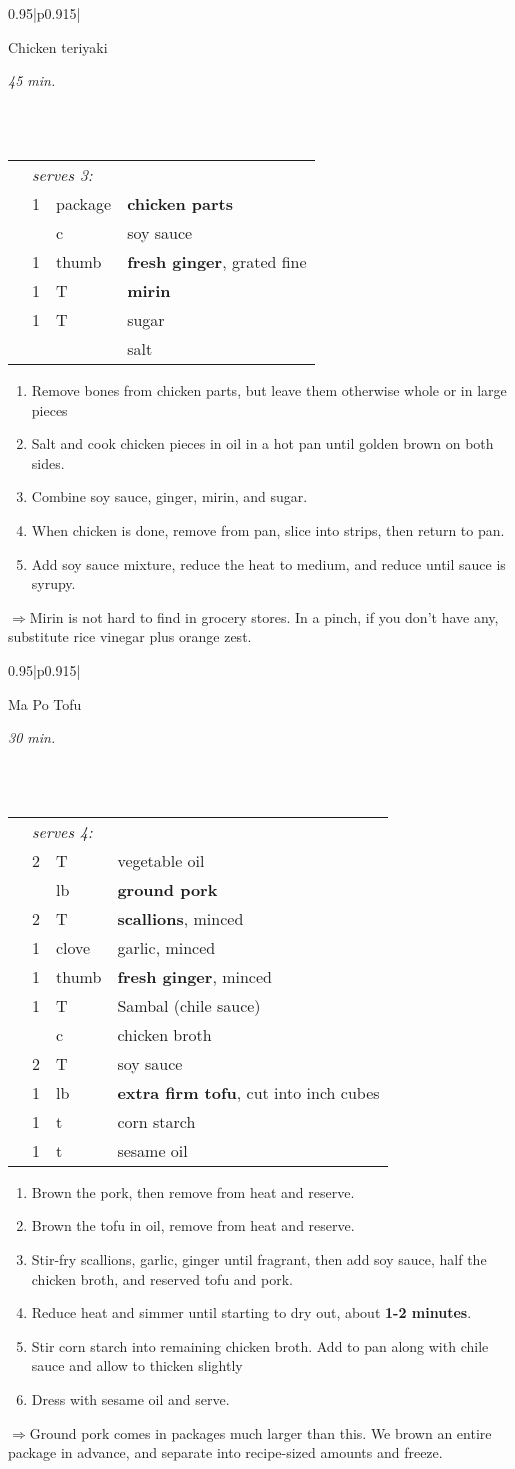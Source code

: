 \documentclass[8pt]{report}
\newcommand{\ingredmargin}{0.25cm}
\newcommand{\fr}[2]{\nicefrac{#1}{#2}}
\newenvironment{recipe}[3]
  {\bigskip \bigskip 
\begin{tabular*}{0.95\textwidth}{|p{0.915\textwidth}|} \hline \vspace{0.25mm}
\begin{minipage}{0.7\textwidth}	\begin{flushleft} {\Large \textsf{#1}} \end{flushleft} \end{minipage}
\begin{minipage}{0.2\textwidth} \begin{flushright} \emph{#2} \end{flushright} \end{minipage} \\ \\ \hline
\begin{ingreds}{#3} \addcontentsline{toc}{section}{#1} \phantomsection \label{rec:#1}} 
  {\\ \hline \end{tabular*} \noindent}
\newenvironment{ingreds}[1]
  {\begin{tabular}{lrlp{0.6\textwidth}} \hspace{\ingredmargin} & \multicolumn{3}{l}{\it #1:} \\}
  {\end{tabular} \medskip}
\newcommand{\ingredsdone}{\end{ingreds}\begin{enumerate}}
\newcommand{\stepsdone}{\end{enumerate} \medskip}
\newcommand{\ingredient}[3]{\hspace{\ingredmargin} & #1 & #2 & #3 \\}
\newcommand{\tip}{$\Rightarrow$}
\begin{document}
\begin{recipe}{Chicken teriyaki}{45 min.}{serves 3}
\index{chicken!teriyaki} \index{japanese!chicken teriyaki}
\ingredient{1}{package}{{\bf chicken parts}}
\ingredient{\fr14}{c}{soy sauce}
\ingredient{1}{thumb}{{\bf fresh ginger}, grated fine}
\ingredient{1}{T}{{\bf mirin}}
\ingredient{1}{T}{sugar}
\ingredient{}{}{salt}
\ingredsdone
\item Remove bones from chicken parts, but leave them otherwise whole or in large pieces
\item Salt and cook chicken pieces in oil in a hot pan until golden brown on both sides.
\item Combine soy sauce, ginger, mirin, and sugar.
\item When chicken is done, remove from pan, slice into strips, then return to pan.
\item Add soy sauce mixture, reduce the heat to medium, and reduce until sauce is syrupy.
\stepsdone
\noindent \tip Mirin is not hard to find in grocery stores.  In a pinch, if you don't have any, substitute rice vinegar plus orange zest.
\end{recipe}

\begin{recipe}{Ma Po Tofu}{30 min.}{serves 4}
\index{tofu!ma po} \index{chinese!ma po tofu}
\ingredient{2}{T}{vegetable oil}
\ingredient{\fr14}{lb}{{\bf ground pork}}
\ingredient{2}{T}{{\bf scallions}, minced}
\ingredient{1}{clove}{garlic, minced}
\ingredient{1}{thumb}{{\bf fresh ginger}, minced}
\ingredient{1}{T}{Sambal (chile sauce)}
\ingredient{\fr13}{c}{chicken broth}
\ingredient{2}{T}{soy sauce}
\ingredient{1}{lb}{{\bf extra firm tofu}, cut into \fr12 inch cubes}
\ingredient{1}{t}{corn starch}
\ingredient{1}{t}{sesame oil}
\ingredsdone
\item Brown the pork, then remove from heat and reserve.
\item Brown the tofu in oil, remove from heat and reserve.
\item Stir-fry scallions, garlic, ginger until fragrant, then add soy sauce, half the chicken broth, and reserved tofu and pork.
\item Reduce heat and simmer until starting to dry out, about {\bf 1-2 minutes}.
\item Stir corn starch into remaining chicken broth.  Add to pan along with chile sauce and allow to thicken slightly
\item Dress with sesame oil and serve.
\stepsdone
\noindent \tip Ground pork comes in packages much larger than this.  We brown an entire package in advance, and separate into
recipe-sized amounts and freeze.
\end{recipe}
\newpage
\end{document}
